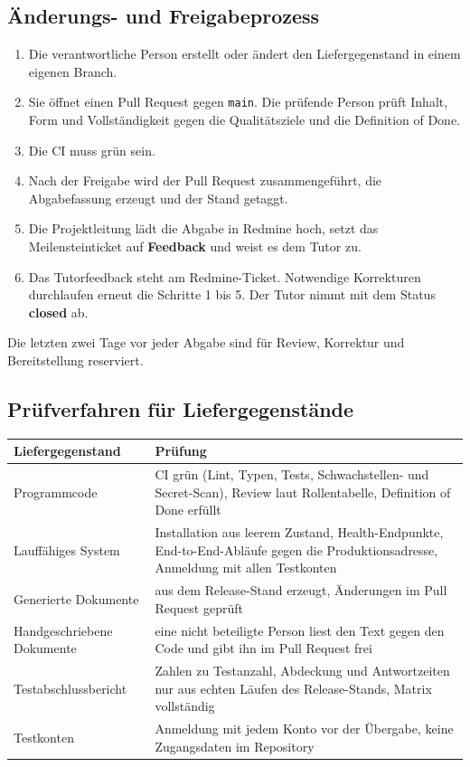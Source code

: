 \documentclass[11pt,a4paper]{article}
\begin{document}
\subsection{Änderungs- und Freigabeprozess}

\begin{enumerate}
\item Die verantwortliche Person erstellt oder ändert den Liefergegenstand in einem eigenen Branch.
\item Sie öffnet einen Pull Request gegen \texttt{main}. Die prüfende Person prüft Inhalt, Form und Vollständigkeit gegen die Qualitätsziele und die Definition of Done.
\item Die CI muss grün sein.
\item Nach der Freigabe wird der Pull Request zusammengeführt, die Abgabefassung erzeugt und der Stand getaggt.
\item Die Projektleitung lädt die Abgabe in Redmine hoch, setzt das Meilensteinticket auf \textbf{Feedback} und weist es dem Tutor zu.
\item Das Tutorfeedback steht am Redmine-Ticket. Notwendige Korrekturen durchlaufen erneut die Schritte 1 bis 5. Der Tutor nimmt mit dem Status \textbf{closed} ab.
\end{enumerate}


Die letzten zwei Tage vor jeder Abgabe sind für Review, Korrektur und Bereitstellung reserviert.

\subsection{Prüfverfahren für Liefergegenstände}

\begin{tabularx}{\linewidth}{@{}>{\hsize=0.62\hsize\RaggedRight\arraybackslash}X >{\hsize=1.38\hsize\RaggedRight\arraybackslash}X@{}}
\toprule
\textbf{Liefergegenstand} & \textbf{Prüfung} \\
\midrule
\endhead
Programmcode & CI grün (Lint, Typen, Tests, Schwachstellen- und Secret-Scan), Review laut Rollentabelle, Definition of Done erfüllt \\
Lauffähiges System & Installation aus leerem Zustand, Health-Endpunkte, End-to-End-Abläufe gegen die Produktionsadresse, Anmeldung mit allen Testkonten \\
Generierte Dokumente & aus dem Release-Stand erzeugt, Änderungen im Pull Request geprüft \\
Handgeschriebene Dokumente & eine nicht beteiligte Person liest den Text gegen den Code und gibt ihn im Pull Request frei \\
Testabschlussbericht & Zahlen zu Testanzahl, Abdeckung und Antwortzeiten nur aus echten Läufen des Release-Stands, Matrix vollständig \\
Testkonten & Anmeldung mit jedem Konto vor der Übergabe, keine Zugangsdaten im Repository \\
\bottomrule
\end{tabularx}
\end{document}
